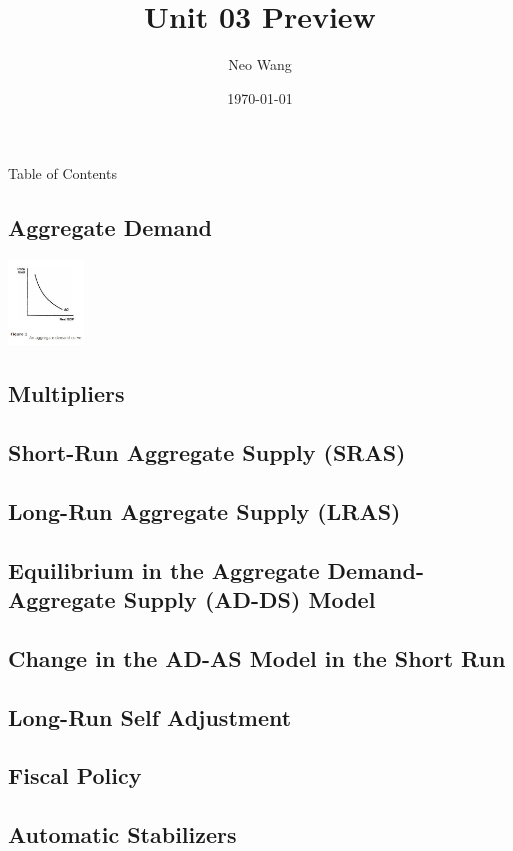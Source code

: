 \documentclass{beamer}
\title{Unit 03 Preview}
\date{\today}
\author{Neo Wang}
\institute{Westlake High School}
\begin{document}
  \maketitle
  \begin{frame}{Table of Contents}
	\tableofcontents
  \end{frame}
  \begin{frame}
	\section{Aggregate Demand}
	\includegraphics[width=2cm]{2021-10-12-11-50-24.png}
  \end{frame}
  \begin{frame}
	\section{Multipliers}
  \end{frame}
  \begin{frame}
	\section{Short-Run Aggregate Supply (SRAS)}
  \end{frame}
  \begin{frame}
	\section{Long-Run Aggregate Supply (LRAS)}
  \end{frame}
  \begin{frame}
	\section{Equilibrium in the Aggregate Demand-Aggregate Supply (AD-DS) Model}
  \end{frame}
  \begin{frame}
	\section{Change in the AD-AS Model in the Short Run}
  \end{frame}
  \begin{frame}
	\section{Long-Run Self Adjustment}
  \end{frame}
  \begin{frame}
	\section{Fiscal Policy}
  \end{frame}
  \begin{frame}
	\section{Automatic Stabilizers}
  \end{frame}
\end{document}
